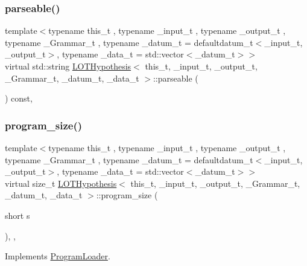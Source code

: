 \subsubsection{\texorpdfstring{parseable()}{parseable()}}
{\footnotesize\ttfamily template$<$typename this\+\_\+t , typename \+\_\+input\+\_\+t , typename \+\_\+output\+\_\+t , typename \+\_\+\+Grammar\+\_\+t , typename \+\_\+datum\+\_\+t  = defaultdatum\+\_\+t$<$\+\_\+input\+\_\+t, \+\_\+output\+\_\+t$>$, typename \+\_\+data\+\_\+t  = std\+::vector$<$\+\_\+datum\+\_\+t$>$$>$ \\
virtual std\+::string \hyperlink{class_l_o_t_hypothesis}{L\+O\+T\+Hypothesis}$<$ this\+\_\+t, \+\_\+input\+\_\+t, \+\_\+output\+\_\+t, \+\_\+\+Grammar\+\_\+t, \+\_\+datum\+\_\+t, \+\_\+data\+\_\+t $>$\+::parseable (\begin{DoxyParamCaption}{ }\end{DoxyParamCaption}) const\hspace{0.3cm}{\ttfamily [inline]}, {\ttfamily [virtual]}}

\mbox{\label{class_l_o_t_hypothesis_a4623fb6919b2bf209ba8cc4a4ba4a9bd}} 
\subsubsection{\texorpdfstring{program\+\_\+size()}{program\_size()}}
{\footnotesize\ttfamily template$<$typename this\+\_\+t , typename \+\_\+input\+\_\+t , typename \+\_\+output\+\_\+t , typename \+\_\+\+Grammar\+\_\+t , typename \+\_\+datum\+\_\+t  = defaultdatum\+\_\+t$<$\+\_\+input\+\_\+t, \+\_\+output\+\_\+t$>$, typename \+\_\+data\+\_\+t  = std\+::vector$<$\+\_\+datum\+\_\+t$>$$>$ \\
virtual size\+\_\+t \hyperlink{class_l_o_t_hypothesis}{L\+O\+T\+Hypothesis}$<$ this\+\_\+t, \+\_\+input\+\_\+t, \+\_\+output\+\_\+t, \+\_\+\+Grammar\+\_\+t, \+\_\+datum\+\_\+t, \+\_\+data\+\_\+t $>$\+::program\+\_\+size (\begin{DoxyParamCaption}\item[{short}]{s }\end{DoxyParamCaption})\hspace{0.3cm}{\ttfamily [inline]}, {\ttfamily [override]}, {\ttfamily [virtual]}}



Implements \hyperlink{class_program_loader_a9485aaa6c23687131ed902f88c4f5731}{Program\+Loader}.


